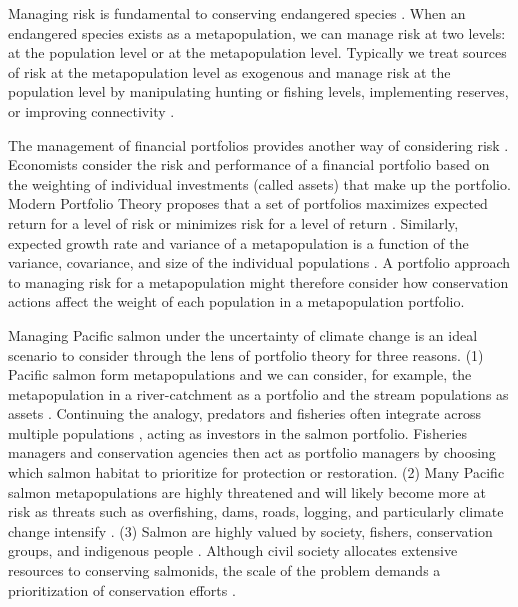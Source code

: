 Managing risk is fundamental to conserving endangered species \citep{burgman2005, iucn2009}. When an endangered species exists as a metapopulation, we can manage risk at two levels: at the population level or at the metapopulation level. Typically we treat sources of risk at the metapopulation level as exogenous and manage risk at the population level by manipulating hunting or fishing levels, implementing reserves, or improving connectivity \citep[e.g.][]{akcakaya2007}.

The management of financial portfolios provides another way of considering risk \citep{figge2004, koellner2006, ando2012}. Economists consider the risk and performance of a financial portfolio based on the weighting of individual investments (called assets) that make up the portfolio. Modern Portfolio Theory proposes that a set of portfolios maximizes expected return for a level of risk or minimizes risk for a level of return \citep{markowitz1952, markowitz1959}. Similarly, expected growth rate and variance of a metapopulation is a function of the variance, covariance, and size of the individual populations \citep{moore2010}. A portfolio approach to managing risk for a metapopulation might therefore consider how conservation actions affect the weight of each population in a metapopulation portfolio.

Managing Pacific salmon under the uncertainty of climate change is an ideal scenario to consider through the lens of portfolio theory for three reasons. (1) Pacific salmon form metapopulations \citep{rieman2000, schtickzelle2007} and we can consider, for example, the metapopulation in a river-catchment as a portfolio and the stream populations as assets \citep{schindler2010, moore2010}. Continuing the analogy, predators and fisheries often integrate across multiple populations \citep{hilborn2003, schindler2008}, acting as investors in the salmon portfolio. Fisheries managers and conservation agencies then act as portfolio managers by choosing which salmon habitat to prioritize for protection or restoration. (2) Many Pacific salmon metapopulations are highly threatened \citep{mcclure2003, gustafson2007, peterman2012} and will likely become more at risk as threats such as overfishing, dams, roads, logging, and particularly climate change intensify \citep[e.g.][]{lackey2003}. (3) Salmon are highly valued by society, fishers, conservation groups, and indigenous people \citep{nrc1996}. Although civil society allocates extensive resources to conserving salmonids, the scale of the problem demands a prioritization of conservation efforts \citep{allendorf1997}.

